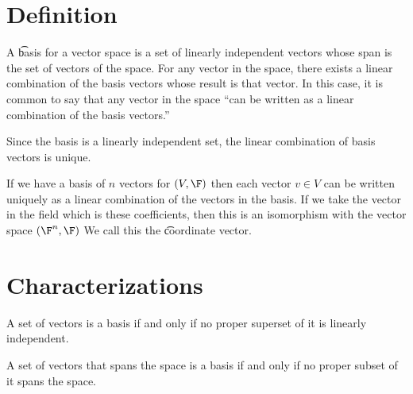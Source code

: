 
\section*{Definition}

A \t{basis for} a vector space is a set of linearly independent vectors whose span is the set of vectors of the space.
For any vector in the space, there exists a linear combination of the basis vectors whose result is that vector.
In this case, it is common to say that any vector in the space ``can be written as a linear combination of the basis vectors.''

Since the basis is a linearly independent set, the linear combination of basis vectors is unique.

If we have a basis of $n$ vectors for $(V, \F )$ then each vector $v \in V$ can be written uniquely as a linear combination of the vectors in the basis.
If we take the vector in the field which is these coefficients, then this is an isomorphism with the vector space $(\F ^n, \F )$
We call this the \t{coordinate vector}.

\section*{Characterizations}

\begin{proposition}
A set of vectors is a basis if and only if no proper superset of it is linearly independent.
\end{proposition}

\begin{proposition}
A set of vectors that spans the space is a basis if and only if no proper subset of it spans the space.
\end{proposition}

\blankpage